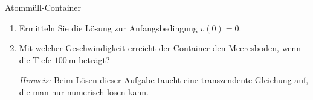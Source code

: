\begin{bsp}{Atommüll-Container}{}
\begin{enumerate}
        \item Ermitteln Sie die Lösung zur Anfangsbedingung
              \(v(0)=0\).

        \item Mit welcher Geschwindigkeit erreicht der Container
              den Meeresboden, wenn die Tiefe \(\SI{100}{\meter}\)
              beträgt?

              \emph{Hinweis:} Beim Lösen dieser Aufgabe taucht
              eine transzendente Gleichung auf, die man nur
              numerisch lösen kann.
    \end{enumerate}
    \pagebreak
    \pagebreak
\end{bsp}












